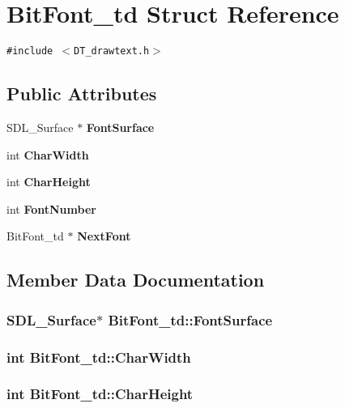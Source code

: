 \section{Bit\-Font\_\-td Struct Reference}
\label{structBitFont__td}
{\tt \#include $<$DT\_\-drawtext.h$>$}

\subsection*{Public Attributes}
\begin{CompactItemize}
\item 
SDL\_\-Surface $\ast$ {\bf Font\-Surface}
\item 
int {\bf Char\-Width}
\item 
int {\bf Char\-Height}
\item 
int {\bf Font\-Number}
\item 
Bit\-Font\_\-td $\ast$ {\bf Next\-Font}
\end{CompactItemize}


\subsection{Member Data Documentation}
\subsubsection{\setlength{\rightskip}{0pt plus 5cm}SDL\_\-Surface$\ast$ Bit\-Font\_\-td::Font\-Surface}\label{structBitFont__td_m0}


\subsubsection{\setlength{\rightskip}{0pt plus 5cm}int Bit\-Font\_\-td::Char\-Width}\label{structBitFont__td_m1}


\subsubsection{\setlength{\rightskip}{0pt plus 5cm}int Bit\-Font\_\-td::Char\-Height}\label{structBitFont__td_m2}


